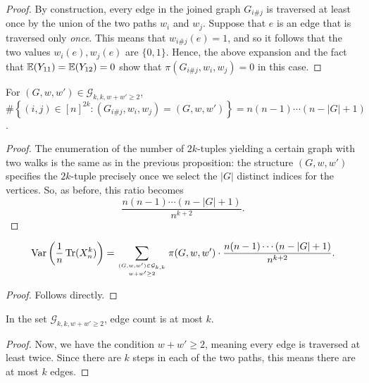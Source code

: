\begin{proof}
  \notready
  By construction, every edge in the joined graph $G_{{i}\#{j}}$ is traversed at least once by the union of the two paths $w_{i}$ and $w_{j}$.  Suppose that $e$ is an edge that is traversed only {\em once}.  This means that $w_{{i}\#{j}}(e) = 1$, and so it follows that the two values $w_{i}(e),w_{j}(e)$ are $\{0,1\}$.  Hence, the above expansion and the fact that $\mathbb{E}(Y_{11})=\mathbb{E}(Y_{12})=0$ show that $\pi(G_{{i}\#{j}},w_{i},w_{j}) = 0$ in this case.
\end{proof}

\begin{proposition}
  \label{lem:g_w_w_count}
  \notready
  For $(G, w, w') \in \mathcal{G}_{k,k,w+w'\ge 2}$, $\#\left\{(i,{j})\in [n]^{2k}\colon (G_{i\#j},w_{i},w_{j}) = (G,w,w')\right\} = n(n-1)\cdots (n-|G|+1)$.
\end{proposition}

\begin{proof}
  \notready
  The enumeration of the number of $2k$-tuples yielding a certain graph with two walks is the same as in the previous proposition: the structure $(G,w,w')$ specifies the $2k$-tuple precisely once we select the $|G|$ distinct indices for the vertices.  So, as before, this ratio becomes \[ \frac{n(n-1)\cdots (n-|G|+1)}{n^{k+2}}. \]
\end{proof}


\begin{lemma}
  \label{lem:simplified_var_trace_as_sum}
  \notready
  \[ \operatorname{Var}\left( \frac1n\operatorname{Tr}({X}_n^k)\right) = \sum_{(G,w,w')\in \mathcal{G}_{k,k}\atop w+w'\ge 2} \pi(G,w,w')\cdot\frac{n(n-1)\cdots (n-|G|+1)}{n^{k+2}}. \]
\end{lemma}

\begin{proof}
  \notready
  Follows directly.
\end{proof}

\begin{lemma}
  \label{lem:g_k_k_edge_count_maximum}
  \notready

  In the set $\mathcal{G}_{k,k,w+w'\ge 2}$, edge count is at most $k$.
\end{lemma}

\begin{proof}
  \notready
  Now, we have the condition $w+w'\ge 2$, meaning every edge is traversed at least twice.  Since there are $k$ steps in each of the two paths, this means there are at most $k$ edges.
\end{proof}

